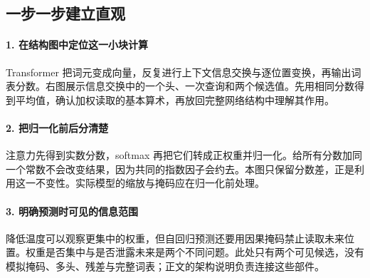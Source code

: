 \subsection*{一步一步建立直观}

\paragraph{1. 在结构图中定位这一小块计算}

Transformer 把词元变成向量，反复进行上下文信息交换与逐位置变换，再输出词表分数。右图展示信息交换中的一个头、一次查询和两个候选值。先用相同分数得到平均值，确认加权读取的基本算术，再放回完整网络结构中理解其作用。



\paragraph{2. 把归一化前后分清楚}

注意力先得到实数分数，softmax 再把它们转成正权重并归一化。给所有分数加同一个常数不会改变结果，因为共同的指数因子会约去。本图只保留分数差，正是利用这一不变性。实际模型的缩放与掩码应在归一化前处理。



\paragraph{3. 明确预测时可见的信息范围}

降低温度可以观察更集中的权重，但自回归预测还要用因果掩码禁止读取未来位置。权重是否集中与是否泄露未来是两个不同问题。此处只有两个可见候选，没有模拟掩码、多头、残差与完整词表；正文的架构说明负责连接这些部件。
